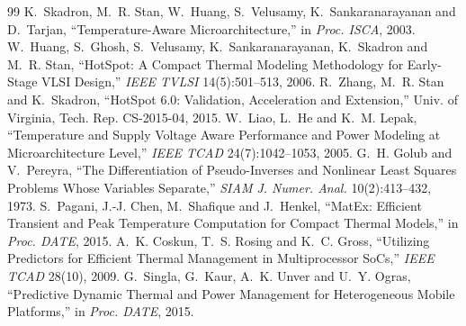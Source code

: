 \documentclass[11pt,a4paper]{article}
\begin{document}
\begin{thebibliography}{99}\small
\setlength{\itemsep}{0pt}
 K.~Skadron, M.~R. Stan, W.~Huang, S.~Velusamy, K.~Sankaranarayanan and
  D.~Tarjan, ``Temperature-Aware Microarchitecture,'' in \emph{Proc. ISCA}, 2003.
 W.~Huang, S.~Ghosh, S.~Velusamy, K.~Sankaranarayanan, K.~Skadron and
  M.~R. Stan, ``HotSpot: A Compact Thermal Modeling Methodology for Early-Stage VLSI Design,''
  \emph{IEEE TVLSI} 14(5):501--513, 2006.
 R.~Zhang, M.~R. Stan and K.~Skadron, ``HotSpot 6.0: Validation, Acceleration
  and Extension,'' Univ. of Virginia, Tech. Rep. CS-2015-04, 2015.
 W.~Liao, L.~He and K.~M. Lepak, ``Temperature and Supply Voltage Aware
  Performance and Power Modeling at Microarchitecture Level,'' \emph{IEEE TCAD} 24(7):1042--1053,
  2005.
 G.~H. Golub and V.~Pereyra, ``The Differentiation of Pseudo-Inverses and
  Nonlinear Least Squares Problems Whose Variables Separate,'' \emph{SIAM J. Numer. Anal.}
  10(2):413--432, 1973.
 S.~Pagani, J.-J. Chen, M.~Shafique and J.~Henkel, ``MatEx: Efficient Transient
  and Peak Temperature Computation for Compact Thermal Models,'' in \emph{Proc. DATE}, 2015.
 A.~K. Coskun, T.~S. Rosing and K.~C. Gross, ``Utilizing Predictors for
  Efficient Thermal Management in Multiprocessor SoCs,'' \emph{IEEE TCAD} 28(10), 2009.
 G.~Singla, G.~Kaur, A.~K. Unver and U.~Y. Ogras, ``Predictive Dynamic Thermal
  and Power Management for Heterogeneous Mobile Platforms,'' in \emph{Proc. DATE}, 2015.
\end{thebibliography}
\end{document}
